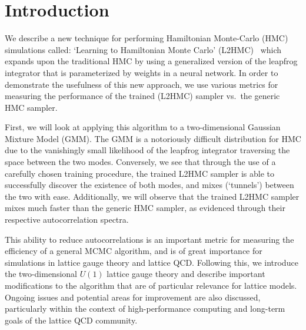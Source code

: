 \documentclass[../main.tex]{subfiles}
\begin{document}
\section{Introduction}%
\label{sec:l2hmc_intro}
%
We describe a new technique for performing Hamiltonian Monte-Carlo (HMC)
simulations called: `Learning to Hamiltonian Monte Carlo'
(L2HMC)~\cite{2017arXiv171109268L} which expands upon the traditional HMC by
using a generalized version of the leapfrog integrator that is parameterized by
weights in a neural network.
%
In order to demonstrate the usefulness of this new approach, we use various
metrics for measuring the performance of the trained (L2HMC) sampler vs.\ the
generic HMC sampler.

First, we will look at applying this algorithm to a two-dimensional Gaussian
Mixture Model (GMM).
%
The GMM is a notoriously difficult distribution for HMC due to the vanishingly
small likelihood of the leapfrog integrator traversing the space between the
two modes.
%
Conversely, we see that through the use of a carefully chosen training
procedure, the trained L2HMC sampler is able to successfully discover the
existence of both modes, and mixes (`tunnels') between the two with ease. 
%
Additionally, we will observe that the trained L2HMC sampler mixes much faster
than the generic HMC sampler, as evidenced through their respective
autocorrelation spectra.

This ability to reduce autocorrelations is an important metric for measuring
the efficiency of a general MCMC algorithm, and is of great importance for
simulations in lattice gauge theory and lattice QCD.
%
Following this, we introduce the two-dimensional $U(1)$ lattice gauge theory
and describe important modifications to the algorithm that are of particular
relevance for lattice models.
%
Ongoing issues and potential areas for improvement are also discussed,
particularly within the context of high-performance computing and long-term
goals of the lattice QCD community.
%
\end{document}
